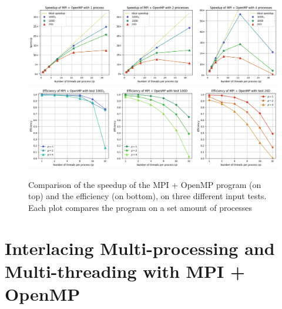 \documentclass[11pt, journal]{IEEEtran}
\begin{document}
\begin{figure}
    \label{stats_mpi_omp}
    \centering
    \includegraphics[width=\linewidth]{imgs/mpi_omp_speedup.png}
    \includegraphics[width=\linewidth]{imgs/mpi_omp_efficiency.png}

    \caption{Comparison of the speedup of the MPI + OpenMP program (on top) and the efficiency (on bottom), on three different input tests. Each plot compares the program on a set amount of processes}
\end{figure}

\section{Interlacing Multi-processing and Multi-threading with MPI + OpenMP}
\end{document}
